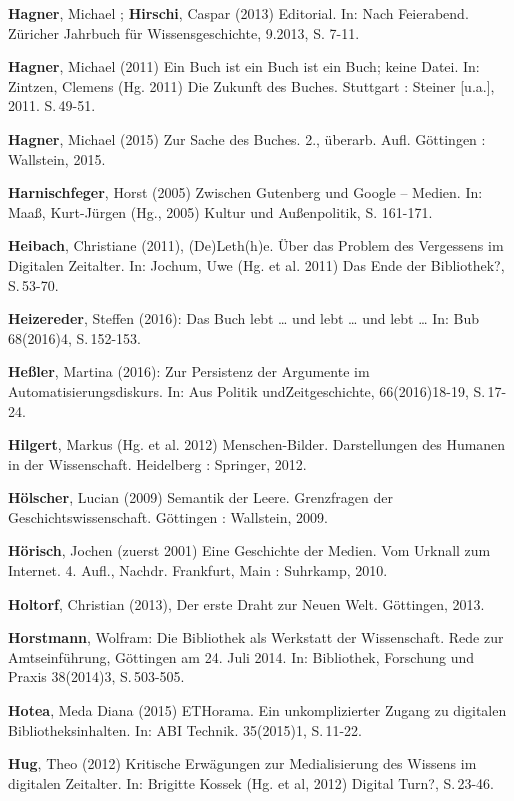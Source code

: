 \documentclass[a4paper,
fontsize=11pt,
oneside,
numbers=noperiodatend,
parskip=half-,
bibliography=totoc,
final
]{scrartcl}
\begin{document}
\textbf{Hagner}, Michael ; \textbf{Hirschi}, Caspar (2013) Editorial.
In: Nach Feierabend. Züricher Jahrbuch für Wissensgeschichte, 9.2013, S.
7-11.

\textbf{Hagner}, Michael (2011) Ein Buch ist ein Buch ist ein Buch;
keine Datei. In: Zintzen, Clemens (Hg. 2011) Die Zukunft des Buches.
Stuttgart : Steiner {[}u.a.{]}, 2011. S.\,49-51.

\textbf{Hagner}, Michael (2015) Zur Sache des Buches. 2., überarb. Aufl.
Göttingen : Wallstein, 2015.

\textbf{Harnischfeger}, Horst (2005) Zwischen Gutenberg und Google --
Medien. In: Maaß, Kurt-Jürgen (Hg., 2005) Kultur und Außenpolitik, S.
161-171.

\textbf{Heibach}, Christiane (2011), (De)Leth(h)e. Über das Problem des
Vergessens im Digitalen Zeitalter. In: Jochum, Uwe (Hg. et al. 2011) Das
Ende der Bibliothek?, S.\,53-70.

\textbf{Heizereder}, Steffen (2016): Das Buch lebt \ldots{} und lebt
\ldots{} und lebt \ldots{} In: Bub 68(2016)4, S.\,152-153.

\textbf{Heßler}, Martina (2016): Zur Persistenz der Argumente im
Automatisierungsdiskurs. In: Aus Politik undZeitgeschichte,
66(2016)18-19, S.\,17-24.

\textbf{Hilgert}, Markus (Hg. et al. 2012) Menschen-Bilder.
Darstellungen des Humanen in der Wissenschaft. Heidelberg : Springer,
2012.

\textbf{Hölscher}, Lucian (2009) Semantik der Leere. Grenzfragen der
Geschichtswissenschaft. Göttingen : Wallstein, 2009.

\textbf{Hörisch}, Jochen (zuerst 2001) Eine Geschichte der Medien. Vom
Urknall zum Internet. 4. Aufl., Nachdr. Frankfurt, Main : Suhrkamp,
2010.

\textbf{Holtorf}, Christian (2013), Der erste Draht zur Neuen Welt.
Göttingen, 2013.

\textbf{Horstmann}, Wolfram: Die Bibliothek als Werkstatt der
Wissenschaft. Rede zur Amtseinführung, Göttingen am 24. Juli 2014. In:
Bibliothek, Forschung und Praxis 38(2014)3, S.\,503-505.

\textbf{Hotea}, Meda Diana (2015) ETHorama. Ein unkomplizierter Zugang
zu digitalen Bibliotheksinhalten. In: ABI Technik. 35(2015)1, S.\,11-22.

\textbf{Hug}, Theo (2012) Kritische Erwägungen zur Medialisierung des
Wissens im digitalen Zeitalter. In: Brigitte Kossek (Hg. et al, 2012)
Digital Turn?, S.\,23-46.
\end{document}
